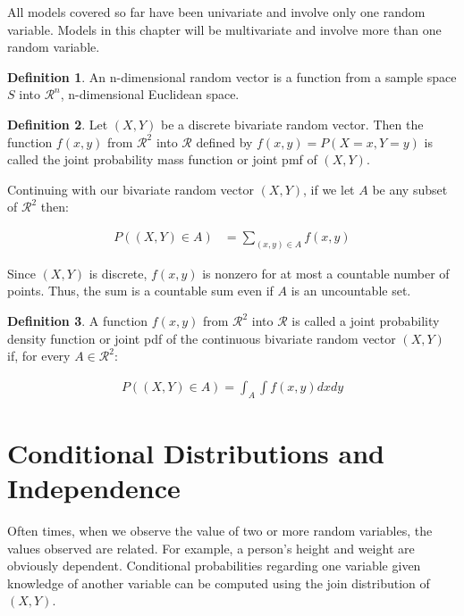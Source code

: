 \documentclass[11pt,a4paper]{report}
\theoremstyle{definition} \newtheorem{defn}{Definition}[section]
\theoremstyle{theorem} \newtheorem{thm}{Theorem}[section]
\theoremstyle{example} \newtheorem{ex}{Example}[section]
\begin{document}
All models covered so far have been univariate and involve only one
random variable.  Models in this chapter will be multivariate and
involve more than one random variable.

\begin{defn} An n-dimensional random vector is a function from a
sample space $S$ into $\mathcal{R}^n$, n-dimensional Euclidean space.
\end{defn}

\begin{defn} Let $(X,Y)$ be a discrete bivariate random vector.  Then
the function $f(x,y)$ from $\mathcal{R}^2$ into $\mathcal{R}$ defined
by $f(x,y) = P(X = x, Y = y)$ is called the joint probability mass
function or joint pmf of $(X,Y)$.
\end{defn}

Continuing with our bivariate random vector $(X,Y)$, if we let $A$ be
any subset of $\mathcal{R}^2$ then:

\begin{align*} P((X,Y) \in A) &= \sum_{(x,y) \in A} f(x,y)
\end{align*}

Since $(X,Y)$ is discrete, $f(x,y)$ is nonzero for at most a countable
number of points.  Thus, the sum is a countable sum even if $A$ is an
uncountable set.

\begin{defn} A function $f(x,y)$ from $\mathcal{R}^2$ into
$\mathcal{R}$ is called a joint probability density function or joint
pdf of the continuous bivariate random vector $(X,Y)$ if, for every $A
\in \mathcal{R}^2$:

  \begin{align*} P((X,Y) \in A) = \int_A \int f(x,y) dx dy
  \end{align*}
\end{defn}

\section{Conditional Distributions and Independence}

Often times, when we observe the value of two or more random
variables, the values observed are related.  For example, a person's
height and weight are obviously dependent.  Conditional probabilities
regarding one variable given knowledge of another variable can be
computed using the join distribution of $(X,Y)$.
\end{document}
